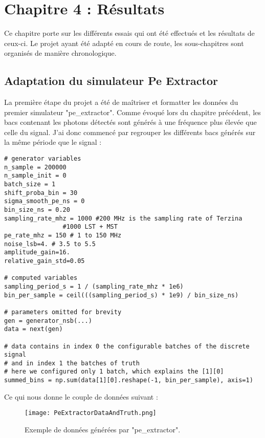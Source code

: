\chapter{Chapitre 4 : Résultats}

Ce chapitre porte sur les différents essais qui ont été effectués et les résultats de ceux-ci.
Le projet ayant été adapté en cours de route, les sous-chapitres sont organisés de manière chronologique.

\section{Adaptation du simulateur Pe Extractor}
La première étape du projet a été de maîtriser et formatter les données du premier simulateur "pe\_extractor".
Comme évoqué lors du chapitre précédent, les bacs contenant les photons détectés sont générés à une fréquence plus élevée que celle du signal.
J'ai donc commencé par regrouper les différents bacs générés sur la même période que le signal :

\begin{lstlisting}[language=iPython,caption={Regroupement des bacs de photons-électrons, signal\_sense.ipynb},captionpos=b]
# generator variables
n_sample = 200000
n_sample_init = 0
batch_size = 1
shift_proba_bin = 30
sigma_smooth_pe_ns = 0
bin_size_ns = 0.20
sampling_rate_mhz = 1000 #200 MHz is the sampling rate of Terzina
				#1000 LST + MST
pe_rate_mhz = 150 # 1 to 150 MHz
noise_lsb=4. # 3.5 to 5.5
amplitude_gain=16.
relative_gain_std=0.05

# computed variables
sampling_period_s = 1 / (sampling_rate_mhz * 1e6)
bin_per_sample = ceil(((sampling_period_s) * 1e9) / bin_size_ns)

# parameters omitted for brevity
gen = generator_nsb(...)
data = next(gen)

# data contains in index 0 the configurable batches of the discrete signal
# and in index 1 the batches of truth
# here we configured only 1 batch, which explains the [1][0]
summed_bins = np.sum(data[1][0].reshape(-1, bin_per_sample), axis=1)
\end{lstlisting}

\newpage
Ce qui nous donne le couple de données suivant :
\begin{figure}[tbph!]
	\centering
	\texttt{[image: PeExtractorDataAndTruth.png]}
	\caption[Exemple de données générées par "pe\_extractor"]{Exemple de données générées par "pe\_extractor".}
\end{figure}

